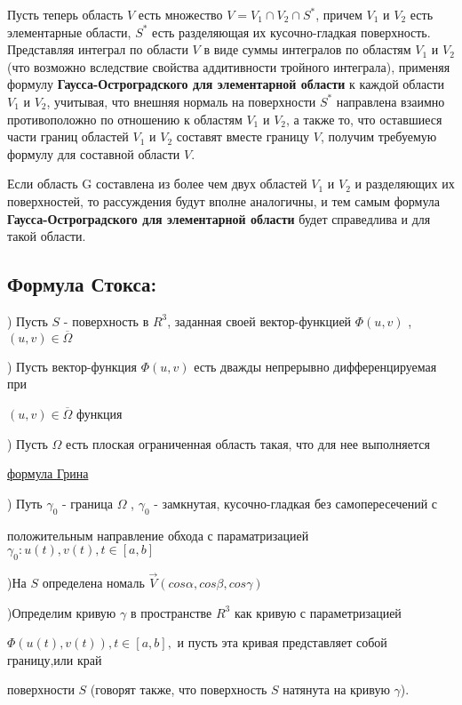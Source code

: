\documentclass[12pt]{article}
\begin{document}
	Пусть теперь область $V$ есть множество $V = V_1 \cap V_2 \cap S^* $, причем $V_1$
и $V_2$ есть элементарные области, $S^* $ есть разделяющая их кусочно-гладкая
поверхность. Представляя интеграл по области $V$ в виде суммы интегралов по областям $V_1$ и $V_2$ (что возможно вследствие свойства аддитивности
тройного интеграла), применяя формулу \textbf{Гаусса-Остроградского для элементарной области} к каждой области $V_1$ и $V_2$,
учитывая, что внешняя нормаль на поверхности $S^* $ направлена взаимно
противоположно по отношению к областям $V_1$ и $V_2$, а также то, что оставшиеся части границ областей $V_1$ и $V_2$ составят вместе границу $V$, получим
требуемую формулу  для составной области $V$.

	Если область G составлена из более чем двух областей
$V_1$ и $V_2$ и разделяющих их поверхностей, то рассуждения будут вполне
аналогичны, и тем самым формула \textbf{Гаусса-Остроградского для элементарной области} будет справедлива и для такой
области.


\newpage
\subsection{Формула Стокса:}

) Пусть $S$ - поверхность в $R^3$, заданная своей вектор-функцией $\Phi(u,v)$ , $(u,v) \in \overline{\Omega}$

) Пусть вектор-функция $\Phi(u,v)$ есть дважды непрерывно дифференцируемая при \par $(u,v) \in \overline{\Omega}$ функция
	
) Пусть $\Omega$ есть плоская ограниченная область такая, что для нее выполняется \par \hyperref[eq3]{формула Грина}

) Путь $\gamma_0$ - граница $\Omega$ , $\gamma_0$ - замкнутая, кусочно-гладкая без самопересечений с \par положительным направление обхода с параматризацией  $\gamma_0 : u(t) , v(t) , t \in [a,b]$

)На $S$ определена номаль $\vec{V}(cos\alpha , cos\beta , cos\gamma)$

)Определим кривую $\gamma$ в пространстве $R^3$ как кривую с параметризацией \par $\Phi(u(t) , v(t)) , t \in [a,b], $ и пусть эта кривая представляет собой границу,или край \par поверхности $S$ (говорят также, что поверхность $S$ натянута
на кривую $\gamma$).
\end{document}
